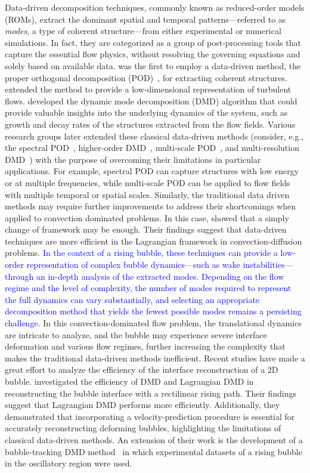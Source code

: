 \documentclass[a4paper,fleqn]{cas-sc}
\newcommand{\hl}[1]{\textcolor{blue}{#1}} %
\newcommand{\hl}[1]{#1} %
\begin{document}
	Data-driven decomposition techniques, commonly known as reduced-order models (ROMs), extract the dominant spatial and temporal patterns—referred to as \textit{modes}, a type of coherent structure—from either experimental or numerical simulations. In fact, they are categorized as a group of post-processing tools that capture the essential flow physics, without resolving the governing equations and solely based on available data. \citet{Lumley1967166} was the first to employ a data-driven method, the proper orthogonal decomposition (POD)~\cite{volkwein2013proper,Berkooz1993}, for extracting coherent structures. \citet{Holmes1996} extended the method to provide a low-dimensional representation of turbulent flows. \citet{SCHMID2010} developed the dynamic mode decomposition (DMD) algorithm that could provide valuable insights into the underlying dynamics of the system, such as growth and decay rates of the structures extracted from the flow fields. Various research groups later extended these classical data-driven methods (consider, e.g., the spectral POD~\cite{Towne2018}, higher-order DMD~\cite{LeClainche2017}, multi-scale POD~\cite{Mendez2019}, and multi-resolution DMD~\cite{Kutzz2016a}) with the purpose of overcoming their limitations in particular applications. For example, spectral POD can capture structures with low energy or at multiple frequencies, while multi-scale POD can be applied to flow fields with multiple temporal or spatial scales. Similarly, the traditional data driven methods may require further improvements to address their shortcomings when applied to convection dominated problems. In this case, \citet{Lu2020} showed that a simply change of framework may be enough. Their findings suggest that data-driven techniques are more efficient in the Lagrangian framework in convection-diffusion problems. \hl{In the context of a rising bubble, these techniques can provide a low-order representation of complex bubble dynamics—such as wake instabilities—through an in-depth analysis of the extracted modes. Depending on the flow regime and the level of complexity, the number of modes required to represent the full dynamics can vary substantially, and selecting an appropriate decomposition method that yields the fewest possible modes remains a persisting challenge.} In this convection-dominated flow problem, the translational dynamics are intricate to analyze, and the bubble may experience severe interface deformation and various flow regimes, further increasing the complexity that makes the traditional data-driven methods inefficient. Recent studies have made a great effort to analyze the efficiency of the interface reconstruction of a 2D bubble. \citet{Yin2023a} investigated the efficiency of DMD and Lagrangian DMD in reconstructing the bubble interface with a rectilinear rising path. Their findings suggest that Lagrangian DMD performs more efficiently. Additionally, they demonstrated that incorporating a velocity-prediction procedure is essential for accurately reconstructing deforming bubbles, highlighting the limitations of classical data-driven methods. An extension of their work is the development of a bubble-tracking DMD method~\cite{Yin2023} in which experimental datasets of a rising bubble in the oscillatory region were used. 
	
\end{document}
